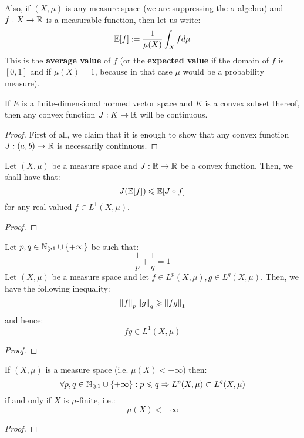         Also, if $(X, \mu)$ is any measure space (we are suppressing the $\sigma$-algebra) and $f: X \to \mathbb{R}$ is a measurable function, then let us write:
            $$\mathbb{E}[f] := \frac{1}{\mu(X)} \int_X f d\mu$$
        This is the \textbf{average value} of $f$ (or the \textbf{expected value} if the domain of $f$ is $[0, 1]$ and if $\mu(X) = 1$, because in that case $\mu$ would be a probability measure).
        \begin{lemma}
            If $E$ is a finite-dimensional normed vector space and $K$ is a convex subset thereof, then any convex function $J: K \to \mathbb{R}$ will be continuous. 
        \end{lemma}
            \begin{proof}
                First of all, we claim that it is enough to show that any convex function $J: (a, b) \to \mathbb{R}$ is necessarily continuous. 
            \end{proof}
        \begin{lemma} \label{lemma: jensen_inequality}
            Let $(X, \mu)$ be a measure space and $J: \mathbb{R} \to \mathbb{R}$ be a convex function. Then, we shall have that:
                $$J( \mathbb{E}[f] ) \leqslant \mathbb{E}[ J \circ f ]$$
            for any real-valued $f \in L^1(X, \mu)$. 
        \end{lemma}
            \begin{proof}
                
            \end{proof}
        \begin{lemma}
            Let $p, q \in \mathbb{N}_{\geqslant 1} \cup \{+\infty\}$ be such that:
                $$\frac1p + \frac1q = 1$$
            Let $(X, \mu)$ be a measure space and let $f \in L^p(X, \mu), g \in L^q(X, \mu)$. Then, we have the following inequality:
                $$\left\| {f} \right\|_p \left\| {g} \right\|_q \geqslant \left\| {fg} \right\|_1$$
            and hence:
                $$fg \in L^1(X, \mu)$$
        \end{lemma}
            \begin{proof}
            \end{proof}
        \begin{corollary}
            If $(X, \mu)$ is a measure space (i.e. $\mu(X) < +\infty$) then:
                $$\forall p, q \in \mathbb{N}_{\geqslant 1} \cup \{+\infty\}: p \leqslant q \Rightarrow L^p(X, \mu) \subset L^q(X, \mu)$$
            if and only if $X$ is $\mu$-finite, i.e.:
                $$\mu(X) < +\infty$$ 
        \end{corollary}
            \begin{proof}
                
            \end{proof}

